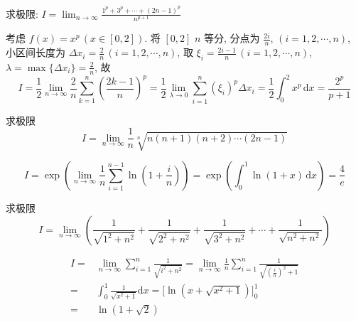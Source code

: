 \documentclass[color=green,titlestyle=hang]{elegantbook}%
\begin{document}
\begin{example}
求极限: $I=\lim_{n\to\infty}\frac{1^p+3^p+\cdots+(2n-1)^p}{n^{p+1}}$
\end{example}\begin{solution}
考虑 $f(x)=x^p\,(x\in[0,2])$. 将 $[0,2]$ $n$ 等分, 分点为 $\frac{2i}{n}$, $(i=1,2,\cdots,n)$, \\
小区间长度为 $\Delta x_i=\frac{2}{n}\,(i=1,2,\cdots,n)$, 取 $\xi_i=\frac{2i-1}{n}\,(i=1,2,\cdots,n)$, $\lambda=\max\{\Delta x_i\}=\frac{2}{n}$,  故\[I=\frac{1}{2}\lim_{n\to\infty}\frac{2}{n}\sum_{k=1}^n\left(\frac{2k-1}{n}\right)^p=\frac{1}{2}\lim_{\lambda\to0}\sum_{i=1}^{n}(\xi_i)^p\Delta x_i=\frac{1}{2}\int_0^2x^p\,\mathrm{d}x=\frac{2^p}{p+1}\]	
\end{solution}

\begin{exercise}求极限\begin{equation*}I=\lim_{n\to\infty}\frac{1}{n}\sqrt[n]{n(n+1)(n+2)\cdots(2n-1)}\end{equation*}
\end{exercise}\begin{Solution}
\[I=\exp\left(\lim_{n\to\infty}\frac{1}{n}\sum_{i=1}^{n-1}\ln\left(1+\frac{i}{n}\right)\right)=
\exp\left(\int_0^1\ln(1+x)\,\mathrm{d}x\right)=\frac{4}{e}\]	
\end{Solution}

\begin{exercise}求极限\begin{equation*}I=\lim_{n\to\infty}\left(\frac{1}{\sqrt{1^2+n^2}}+\frac{1}{\sqrt{2^2+n^2}}+\frac{1}{\sqrt{3^2+n^2}}+\cdots+\frac{1}{\sqrt{n^2+n^2}}\right)\end{equation*}
\end{exercise}\begin{Solution}
\begin{align*}I
=&\lim_{n\to\infty}\sum_{i=1}^{n}\frac{1}{\sqrt{i^2+n^2}}=\lim_{n\to\infty}\frac{1}{n}\sum_{i=1}^{n}\frac{1}{\sqrt{(\frac{i}{n})^2+1}}\\
=&\int_{0}^{1}\frac{1}{\sqrt{x^2+1}}\mathrm{d}x=\Big[\ln(x+\sqrt{x^2+1})\Big]_{0}^{1}\\
=&\ln(1+\sqrt{2})	
\end{align*}
\end{Solution}
\end{document}
